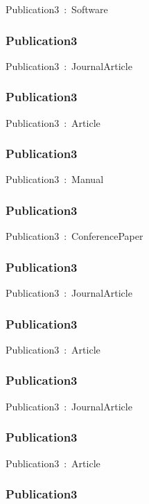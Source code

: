 \documentclass{article}
\begin{document}
Publication3~:~Software

\subsubsection*{Publication3}

Publication3~:~JournalArticle

\subsubsection*{Publication3}

Publication3~:~Article

\subsubsection*{Publication3}

Publication3~:~Manual

\subsubsection*{Publication3}

Publication3~:~ConferencePaper

\subsubsection*{Publication3}

Publication3~:~JournalArticle

\subsubsection*{Publication3}

Publication3~:~Article

\subsubsection*{Publication3}

Publication3~:~JournalArticle

\subsubsection*{Publication3}

Publication3~:~Article

\subsubsection*{Publication3}
\end{document}
